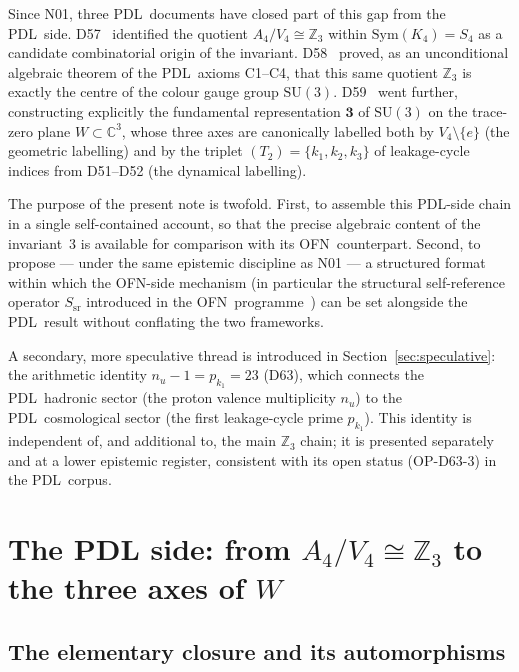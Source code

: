 \documentclass[11pt,a4paper]{article}
\theoremstyle{plain}
\theoremstyle{definition}
\theoremstyle{remark}
\newcommand{\PDL}{\textnormal{PDL}}
\newcommand{\OFN}{\textnormal{OFN}}
\newcommand{\Kfour}{K_4}
\newcommand{\Sfour}{S_4}
\newcommand{\Afour}{A_4}
\newcommand{\Vfour}{V_4}
\newcommand{\Zthree}{\mathbb{Z}_3}
\newcommand{\SUthree}{\mathrm{SU}(3)}
\newcommand{\nuu}{n_u}
\newcommand{\kone}{k_1}
\newcommand{\ktwo}{k_2}
\newcommand{\kthree}{k_3}
\newcommand{\pkone}{p_{k_1}}
\newcommand{\Ssr}{S_{\mathrm{sr}}}
\begin{document}
Since N01, three \PDL\ documents have closed part of this gap from the \PDL\ side. D57~\cite{D57} identified the quotient $\Afour/\Vfour \cong \Zthree$ within $\mathrm{Sym}(\Kfour) = \Sfour$ as a candidate combinatorial origin of the invariant. D58~\cite{D58} proved, as an unconditional algebraic theorem of the \PDL\ axioms C1--C4, that this same quotient $\Zthree$ is exactly the centre of the colour gauge group $\SUthree$. D59~\cite{D59} went further, constructing explicitly the fundamental representation $\mathbf{3}$ of $\SUthree$ on the trace-zero plane $W \subset \mathbb{C}^3$, whose three axes are canonically labelled both by $\Vfour \setminus \{e\}$ (the geometric labelling) and by the triplet $(T_2) = \{\kone, \ktwo, \kthree\}$ of leakage-cycle indices from D51--D52 (the dynamical labelling).

The purpose of the present note is twofold. First, to assemble this \PDL-side chain in a single self-contained account, so that the precise algebraic content of the invariant~3 is available for comparison with its \OFN\ counterpart. Second, to propose --- under the same epistemic discipline as N01 --- a structured format within which the \OFN-side mechanism (in particular the structural self-reference operator $\Ssr$ introduced in the \OFN\ programme~\cite{DTOCOFN}) can be set alongside the \PDL\ result without conflating the two frameworks.

A secondary, more speculative thread is introduced in Section~\ref{sec:speculative}: the arithmetic identity $\nuu - 1 = \pkone = 23$ (D63), which connects the \PDL\ hadronic sector (the proton valence multiplicity $\nuu$) to the \PDL\ cosmological sector (the first leakage-cycle prime $\pkone$). This identity is independent of, and additional to, the main $\Zthree$ chain; it is presented separately and at a lower epistemic register, consistent with its open status (OP-D63-3) in the \PDL\ corpus.

\section{The PDL side: from \texorpdfstring{$\Afour/\Vfour \cong \Zthree$}{A4/V4 = Z3} to the three axes of \texorpdfstring{$W$}{W}}
\label{sec:pdl_side}

\subsection{The elementary closure and its automorphisms}
\end{document}
